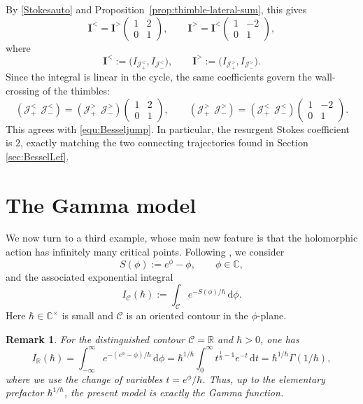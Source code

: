 \documentclass[11pt]{amsart}
\theoremstyle{plain}
\newtheorem{rmk}[thm]{Remark}
\newcommand{\R}{\mathbb R}
\newcommand{\C}{\mathbb C}
\newcommand{\dd}{\mathrm d}
\newcommand{\J}{\mathcal J}
\begin{document}
By \eqref{Stokesauto} and Proposition~\ref{prop:thimble-lateral-sum}, this gives
\[
\mathbf I^{<}=\mathbf I^{>}
\begin{pmatrix}
1&2\\
0&1
\end{pmatrix},
\qquad
\mathbf I^{>}=\mathbf I^{<}
\begin{pmatrix}
1&-2\\
0&1
\end{pmatrix},
\]
where
\[
\mathbf I^{<}:=\bigl(I_{\J_+^{<}},I_{\J_-^{<}}\bigr),
\qquad
\mathbf I^{>}:=\bigl(I_{\J_+^{>}},I_{\J_-^{>}}\bigr).
\]
Since the integral is linear in the cycle, the same coefficients govern the wall-crossing of the thimbles:
\[
(\J_+^<\ \ \J_-^<)
=
(\J_+^>\ \ \J_-^>)
\begin{pmatrix}
1&2\\
0&1
\end{pmatrix}, \qquad
(\J_+^>\ \ \J_-^>)
=
(\J_+^<\ \ \J_-^<)
\begin{pmatrix}
1&-2\\
0&1
\end{pmatrix}.
\]
This agrees with \eqref{equ:Besseljump}. In particular, the resurgent Stokes coefficient is \(2\), exactly matching the two connecting trajectories found in Section \ref{sec:BesselLef}.

\medskip
\section{The Gamma model}\label{sec:gamma-model}

We now turn to a third example, whose main new feature is that the holomorphic action has infinitely many critical points. Following \cite[Appendix~C]{HarlowMaltzWitten2011}, we consider
\[
S(\phi):=e^\phi-\phi,
\qquad \phi\in\C,
\]
and the associated exponential integral
\[
I_{\mathcal C}(\hbar):=\int_{\mathcal C} e^{-S(\phi)/\hbar}\,\dd\phi.
\]
Here \(\hbar\in\C^\times\) is small and \(\mathcal C\) is an oriented contour in the \(\phi\)-plane.

\begin{rmk}\label{rmk:gamma-model-contour}
For the distinguished contour \(\mathcal C=\R\) and $\hbar>0$, one has
\begin{equation*}\label{eq:gammaisgamma}
I_{\R}(\hbar)
=
\int_{-\infty}^{\infty} e^{-(e^\phi-\phi)/\hbar}\,\dd\phi
=
\hbar^{1/\hbar}\int_{0}^{\infty} t^{\frac{1}{\hbar}-1}e^{-t}\,\dd t
=
\hbar^{1/\hbar}\Gamma(1/\hbar),
\end{equation*}
where we use the change of variables \(t=e^\phi/\hbar\). Thus, up to the elementary prefactor \(\hbar^{1/\hbar}\), the present model is exactly the Gamma function.
\end{rmk}
\end{document}

